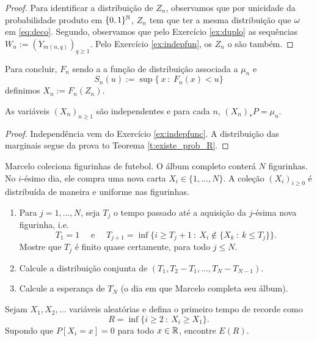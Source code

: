  \begin{proof}
Para identificar a distribuição de $Z_n$, observamos que por unicidade da probabilidade produto em $\{0,1\}^{{\mathbb N}}$, $Z_n$ tem que ter a mesma distribuição que
$\omega$ em \eqref{eq:deco}.
Segundo, observamos que pelo Exercício \ref{ex:duplo} as sequências $W_n:=(Y_{m(n,q)})_{q\ge 1}$.
Pelo Exercício \ref{ex:indepfun}, os $Z_n$ o são também.
\end{proof}


Para concluir, $F_n$ sendo a a função de distribuição associada a $\mu_n$ e
$$S_n(u):=\sup\{\ x  \ : \ F_n(x)<u \}$$
definimos $X_n:=F_n(Z_n)$.

\begin{proposition}
 As variáveis $(X_n)_{n\ge 1}$ são independentes e
 para cada $n$, $(X_n)_* P=\mu_n$.
 \end{proposition}

 \begin{proof}
  Independência vem do Exercício \ref{ex:indepfunc}. A distribuição das marginais segue da prova to Teorema \ref{t:existe_prob_R}.

 \end{proof}



\begin{exercise}
  Marcelo coleciona figurinhas de futebol.
  O álbum completo conter\'a $N$ figurinhas. No $i$-ésimo dia, ele compra uma nova carta $X_i \in \{1, \dots, N\}$.
  A cole\c{c}\~ao $(X_i)_{i \geq 0}$ é distribuída de maneira \iid e uniforme nas figurinhas.
  \begin{enumerate}[\quad a)]
  \item Para $j = 1, \dots, N$, seja $T_j$ o tempo passado até a aquisi\c{c}\~ao da $j$-ésima nova figurinha, i.e.
    \begin{equation}
      T_1 = 1 \quad \text{ e } \quad T_{j+1} = \inf\{i\ge T_{j}+1 \ : \  X_i\notin \{X_k\ : \ k\le T_j\} \}.
    \end{equation}
    Mostre que $T_j$ é finito quase certamente, para todo $j \leq N$.
  \item Calcule a distribuição conjunta de $(T_1, T_2 - T_1, \dots, T_N - T_{N-1})$.
  \item Calcule a esperança de $T_N$ (o dia em que Marcelo completa seu álbum).
  \end{enumerate}
\end{exercise}

\begin{exercise}
  Sejam $X_1, X_2, \dots$ variáveis aleatórias \iid e defina o primeiro tempo de recorde como
  \begin{equation}
    R = \inf\{i \geq 2 \ : \  X_i \geq X_1\}.
  \end{equation}
  Supondo que $P[X_i=x]=0$ para todo $x\in{\ensuremath{\mathbb R}}$, encontre $E(R)$.
\end{exercise}


